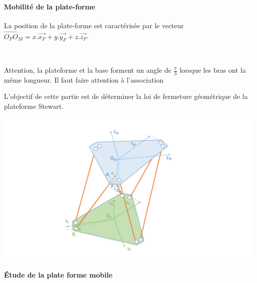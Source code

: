 \paragraph{Mobilité de la plate-forme}

La position de la plate-forme est caractérisée par le vecteur $\overrightarrow{O_FO_M}=x.\overrightarrow{x_F}+y.\overrightarrow{y_F}+z.\overrightarrow{z_F}$.


~\

Attention, la plateforme et la base forment un angle de $\frac{\pi}{3}$ lorsque les bras ont la même longueur. Il faut faire attention à l'association


\newpage


L'objectif de cette partie est de déterminer la loi de fermeture géométrique de la plateforme Stewart.

\begin{center}
 \includegraphics[width=0.8\linewidth]{img/Stewart_cin1}
\end{center}

\paragraph{Étude de la plate forme mobile} ~\ \\

